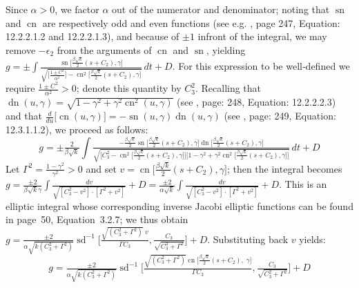 \documentclass[12pt]{article}
\theoremstyle{plain}
\theoremstyle{definition}
\theoremstyle{remark}
\begin{document}
  Since \(\alpha>0\), we factor \(\alpha\) out of the numerator and denominator; noting that \(\operatorname{sn}\) and \(\operatorname{cn}\) are respectively odd and even functions (see e.g. \cite{JD}, page 247, Equation: 12.2.2.1.2 and 12.2.2.1.3), and because of \(\pm1\) infront of the integral, we may remove \(-\epsilon_2\) from the arguments of \(\operatorname{cn}\) and \(\operatorname{sn}\), yielding \(g=\pm \displaystyle \int \tfrac{\operatorname{sn}\!\big[\frac{\beta\sqrt k}{2}(s+C_2),\gamma\big]}{\sqrt{\big[\frac{1\pm C^2}{\alpha^2}\big]-\operatorname{cn}^2\!\big[\frac{\beta\sqrt k}{2}(s+C_2),\gamma\big]}}\, dt + D\). For this expression to be well‑defined we require \(\frac{1\pm C^2}{\alpha^2}>0\); denote this quantity by \(C_3^2\). Recalling that \(\operatorname{dn}(u,\gamma)=\sqrt{1-\gamma^2+\gamma^2\operatorname{cn}^2(u,\gamma)}\) (see \cite{JD}, page: 248, Equation: 12.2.2.2.3) and that \(\frac{d}{du}\big[\operatorname{cn}(u,\gamma)\big]=-\operatorname{sn}(u,\gamma)\operatorname{dn}(u,\gamma)\) (see \cite{JD}, page: 249, Equation: 12.3.1.1.2), we proceed as follows:
 \footnotesize\[
  g=\pm \tfrac{2}{\beta\sqrt k}\displaystyle \int \tfrac{-\frac{\beta\sqrt k}{2}\operatorname{sn}\!\big[\frac{\beta\sqrt k}{2}(s+C_2),\gamma\big]\operatorname{dn}\!\big[\frac{\beta\sqrt k}{2}(s+C_2),\gamma\big]}{\sqrt{\big[C_3^2-\operatorname{cn}^2\!\big[\frac{\beta\sqrt k}{2}(s+C_2),\gamma\big]\big]\big[1-\gamma^2+\gamma^2\operatorname{cn}^2\!\big[\frac{\beta\sqrt k}{2}(s+C_2),\gamma\big]\big]}}\, dt + D   
 \]\normalsize
 Let \(\Gamma^2=\frac{1-\gamma^2}{\gamma^2}>0\) and set \(v=\operatorname{cn}\!\big[\tfrac{\beta\sqrt k}{2}(s+C_2),\gamma\big]\); then the integral becomes \(g=\frac{\pm2}{\beta\sqrt{k}\gamma}\int\frac{dv}{\sqrt{[C_3^2-v^2]\cdot[\Gamma^2+v^2]}}+D=\frac{\pm2}{\alpha\sqrt{k}}\int\frac{dv}{\sqrt{[C_3^2-v^2]\cdot[\Gamma^2+v^2]}}+D.\) This is an elliptic integral whose corresponding inverse Jacobi elliptic functions can be found in \cite{La} page~50, Equation~3.2.7; we thus obtain \(g=\frac{\pm2}{\alpha\sqrt{k(C_3^2+\Gamma^2)}}\operatorname{sd}^{-1}\!\big[\tfrac{\sqrt{(C_3^2+\Gamma^2)}\;v}{\Gamma C_3},\tfrac{C_3}{\sqrt{C_3^2+\Gamma^2}}\big]+D\). Substituting back \(v\) yields:
 \[
   \boxed{g=\tfrac{\pm2}{\alpha\sqrt{k(C_3^2+\Gamma^2)}}\operatorname{sd}^{-1}\Big[\tfrac{\sqrt{(C_3^2+\Gamma^2)}\operatorname{cn}\big[\frac{\beta\sqrt k}{2}(s+C_2),\;\gamma\big]}{\Gamma C_3},\tfrac{C_3}{\sqrt{C_3^2+\Gamma^2}}\Big]+D}
 \]
 
\end{document}
